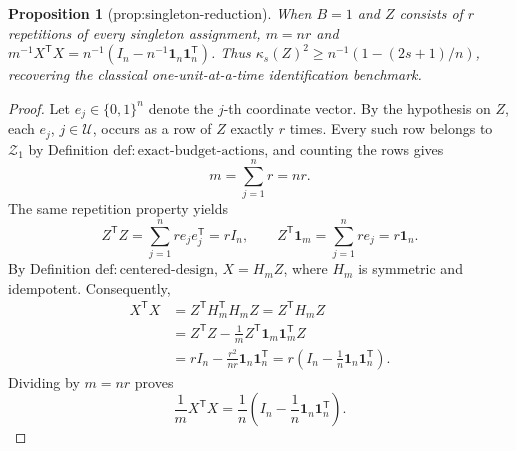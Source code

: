 \documentclass{article}
\newtheorem{proposition}{Proposition}
\begin{document}
\begin{proposition}[prop:singleton-reduction]\label{prop:singleton-reduction}
When \(B=1\) and \(Z\) consists of \(r\) repetitions of every singleton assignment, \(m=nr\) and \(m^{-1}X^{\mathsf T}X=n^{-1}(I_n-n^{-1}\mathbf 1_n\mathbf 1_n^{\mathsf T})\). Thus \(\kappa_s(Z)^2\ge n^{-1}(1-(2s+1)/n)\), recovering the classical one-unit-at-a-time identification benchmark.
\end{proposition}
\begin{proof}
Let \(e_j\in\{0,1\}^n\) denote the \(j\)-th coordinate vector.  By the hypothesis on \(Z\), each \(e_j\), \(j\in\mathcal U\), occurs as a row of \(Z\) exactly \(r\) times.  Every such row belongs to \(\mathcal Z_1\) by Definition \(\mathrm{def{:}exact\mbox{-}budget\mbox{-}actions}\), and counting the rows gives
\[
m=\sum_{j=1}^n r=nr.
\]
The same repetition property yields
\[
Z^{\mathsf T}Z=\sum_{j=1}^n r e_je_j^{\mathsf T}=rI_n,
\qquad
Z^{\mathsf T}\mathbf 1_m=\sum_{j=1}^n r e_j=r\mathbf 1_n.
\]
By Definition \(\mathrm{def{:}centered\mbox{-}design}\), \(X=H_mZ\), where \(H_m\) is symmetric and idempotent.  Consequently,
\[
\begin{aligned}
X^{\mathsf T}X
&=Z^{\mathsf T}H_m^{\mathsf T}H_mZ
=Z^{\mathsf T}H_mZ\\
&=Z^{\mathsf T}Z-\frac{1}{m}Z^{\mathsf T}\mathbf 1_m\mathbf 1_m^{\mathsf T}Z\\
&=rI_n-\frac{r^2}{nr}\mathbf 1_n\mathbf 1_n^{\mathsf T}
=r\left(I_n-\frac{1}{n}\mathbf 1_n\mathbf 1_n^{\mathsf T}\right).
\end{aligned}
\]
Dividing by \(m=nr\) proves
\[
\frac{1}{m}X^{\mathsf T}X
=\frac{1}{n}\left(I_n-\frac{1}{n}\mathbf 1_n\mathbf 1_n^{\mathsf T}\right).
\]


\end{proof}
\end{document}
